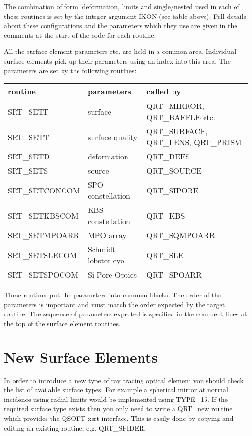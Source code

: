 \documentclass[letterpaper,10pt,english]{sphinxmanual}
\begin{document}
The combination of form, deformation, limits and single/nested used in each
of these routines is set by the integer argument IKON (see table above).
Full details about
these configurations and the parameters which they use are given in the
comments at the start of the code for each routine.

All the surface element parameters etc. are held in a common area. Individual
surface elements pick up their parameters using an index into this area.
The parameters are set by the following routines:


\begin{savenotes}\sphinxattablestart
\centering
\begin{tabulary}{\linewidth}[t]{|T|T|T|}
\hline
\sphinxstyletheadfamily 
routine
&\sphinxstyletheadfamily 
parameters
&\sphinxstyletheadfamily 
called by
\\
\hline
SRT\_SETF
&
surface
&
QRT\_MIRROR, QRT\_BAFFLE etc.
\\
\hline
SRT\_SETT
&
surface quality
&
QRT\_SURFACE, QRT\_LENS, QRT\_PRISM
\\
\hline
SRT\_SETD
&
deformation
&
QRT\_DEFS
\\
\hline
SRT\_SETS
&
source
&
QRT\_SOURCE
\\
\hline
SRT\_SETCONCOM
&
SPO constellation
&
QRT\_SIPORE
\\
\hline
SRT\_SETKBSCOM
&
KBS constellation
&
QRT\_KBS
\\
\hline
SRT\_SETMPOARR
&
MPO array
&
QRT\_SQMPOARR
\\
\hline
SRT\_SETSLECOM
&
Schmidt lobster eye
&
QRT\_SLE
\\
\hline
SRT\_SETSPOCOM
&
Si Pore Optics
&
QRT\_SPOARR
\\
\hline
\end{tabulary}
\par
\sphinxattableend\end{savenotes}

These routines put the parameters
into common blocks. The order of the parameters is important and must
match the order expected by the target routine. The sequence of
parameters expected is specified in the comment lines at the top
of the surface element routines.


\section{New Surface Elements}
\label{\detokenize{xsrt_new_surfaces:new-surface-elements}}\label{\detokenize{xsrt_new_surfaces::doc}}
In order to introduce a  new type of ray tracing optical element you
should check the list of available surface types. For example a
spherical mirror at normal incidence using radial limits
would be implemented using TYPE=15. If the required surface type
exists then you only need to
write a QRT\_new routine which provides the QSOFT xsrt interface.
This is easily done
by copying and editing an existing routine, e.g. QRT\_SPIDER.
\end{document}

